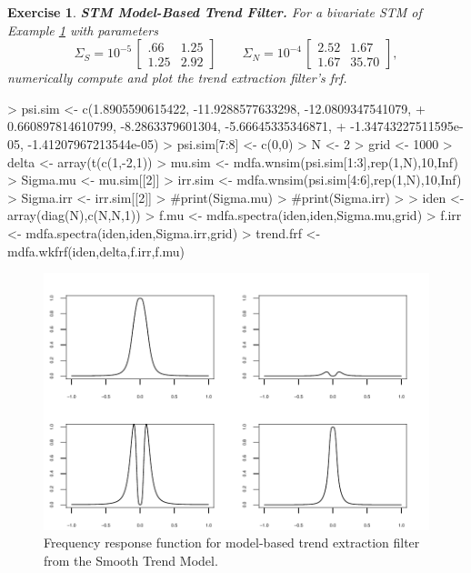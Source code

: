 \documentclass[a4paper]{book}
\newtheorem{Exercise}{Exercise}
\begin{document}
\begin{Exercise} {\bf STM Model-Based Trend Filter.} \rm
\label{exer:trend-i2}
 For a bivariate STM of Example \ref{exer:trend-i2} with parameters 
\[
 \Sigma_{S} = 10^{-5} \, \left[ \begin{array}{ll} 
   .66   &  1.25   \\
   1.25  &  2.92   \end{array}  \right]
 \qquad  \Sigma_{N} =  10^{-4} \, \left[ \begin{array}{ll}
        2.52  &  1.67    \\
        1.67 &  35.70   \end{array} \right],
\]
 numerically compute and plot the trend extraction filter's frf.
\end{Exercise}


\begin{Schunk}
\begin{Sinput}
> psi.sim <- c(1.8905590615422, -11.9288577633298, -12.0809347541079, 
+              0.660897814610799, -8.2863379601304, -5.66645335346871, 
+              -1.34743227511595e-05, -1.41207967213544e-05)
> psi.sim[7:8] <- c(0,0)
> N <- 2
> grid <- 1000
> delta <- array(t(c(1,-2,1)) %
> mu.sim <- mdfa.wnsim(psi.sim[1:3],rep(1,N),10,Inf)
> Sigma.mu <- mu.sim[[2]]
> irr.sim <- mdfa.wnsim(psi.sim[4:6],rep(1,N),10,Inf)
> Sigma.irr <- irr.sim[[2]]
> #print(Sigma.mu)
> #print(Sigma.irr)
> 
> iden <- array(diag(N),c(N,N,1))
> f.mu <- mdfa.spectra(iden,iden,Sigma.mu,grid)
> f.irr <- mdfa.spectra(iden,iden,Sigma.irr,grid)
> trend.frf <- mdfa.wkfrf(iden,delta,f.irr,f.mu)
\end{Sinput}
\end{Schunk}


 \begin{figure}[htb!]
\begin{center}
\includegraphics[]{stm_frf.pdf}
\caption{Frequency response function for model-based trend
 extraction filter from the Smooth Trend Model.}
\label{fig:stm-frf}
\end{center}
\end{figure} 
\end{document}
